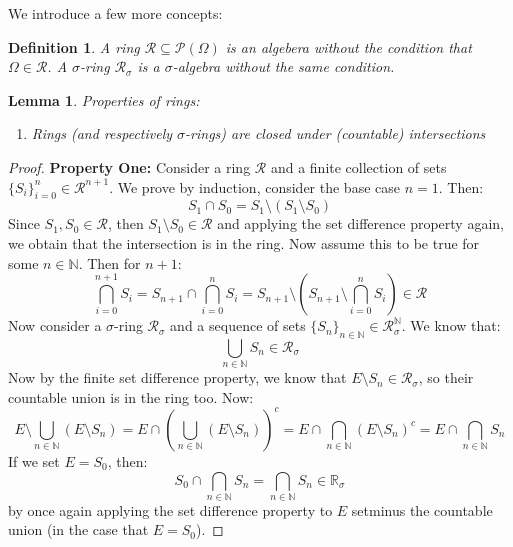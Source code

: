 \documentclass[10pt,letterpaper]{article} %
\newtheorem{lem}{Lemma}[section]
\newtheorem{defn}{Definition}[section]
\begin{document}
We introduce a few more concepts:
\begin{defn}
A ring $\mathcal{R} \subseteq \mathcal{P}(\Omega)$ is an algebera without the condition that $\Omega \in \mathcal{R}$. A $\sigma$-ring $\mathcal{R}_\sigma$ is a $\sigma$-algebra without the same condition.
\end{defn}

\begin{lem}
Properties of rings:
\begin{enumerate}
\item Rings (and respectively $\sigma$-rings) are closed under (countable) intersections
\end{enumerate}
\end{lem}
\begin{proof}
\textbf{Property One:} Consider a ring $\mathcal{R}$ and a finite collection of sets $\{S_i\}_{i = 0}^n \in \mathcal{R}^{n+1}$.
We prove by induction, consider the base case $n=1$. Then:
\begin{equation*}
S_1 \cap S_0 = S_1\setminus(S_1 \setminus S_0)
\end{equation*}
Since $S_1, S_0 \in \mathcal{R}$, then $S_1 \setminus S_0 \in \mathcal{R}$ and applying the set difference property again, we obtain that the intersection is in the ring. Now
assume this to be true for some $n \in \mathbb{N}$. Then for $n+1$:
\begin{equation*}
\bigcap_{i=0}^{n+1}S_i = S_{n+1} \cap \bigcap_{i=0}^n S_i = S_{n+1} \setminus \left(S_{n+1} \setminus \bigcap_{i=0}^n S_i\right) \in \mathcal{R}
\end{equation*}
Now consider a $\sigma$-ring $\mathcal{R}_\sigma$ and a sequence of sets $\{S_n\}_{n \in \mathbb{N}} \in \mathcal{R}_\sigma^\mathbb{N}$. We know that:
\begin{equation*}
\bigcup_{n \in \mathbb{N}}S_n \in \mathcal{R}_\sigma
\end{equation*}
Now by the finite set difference property, we know that $E\setminus S_n \in \mathcal{R}_\sigma$, so their countable union is in the ring too. Now:
\begin{equation*}
E \setminus \bigcup_{n \in \mathbb{N}}(E \setminus S_n) = E \cap \left(\bigcup_{n \in \mathbb{N}}(E \setminus S_n)\right)^c = E \cap \bigcap_{n \in \mathbb{N}}(E \setminus S_n)^c = E \cap \bigcap_{n \in \mathbb{N}}S_n
\end{equation*}
If we set $E = S_0$, then:
\begin{equation*}
S_0 \cap \bigcap_{n \in \mathbb{N}}S_n = \bigcap_{n \in \mathbb{N}}S_n \in \mathbb{R}_\sigma
\end{equation*}
by once again applying the set difference property to $E$ setminus the countable union (in the case that $E = S_0$).
\end{proof}
\end{document}
